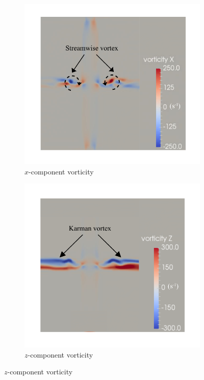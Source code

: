 \documentclass[oneside]{utmthesis}
\begin{document}
\begin{figure}
  \centering
  \begin{subfigure}[h]{0.7\textwidth}
    \includegraphics[width=\textwidth]{figs/vorx90}
    \caption{$x$-component vorticity}
    \label{fig:vorx90}
  \end{subfigure}

  \begin{subfigure}[h]{0.7\textwidth}
    \includegraphics[width=\textwidth]{figs/vorz90}
    \caption{$z$-component vorticity}
    \label{fig:vorz90}
  \end{subfigure}


\end{figure}
\end{document}
